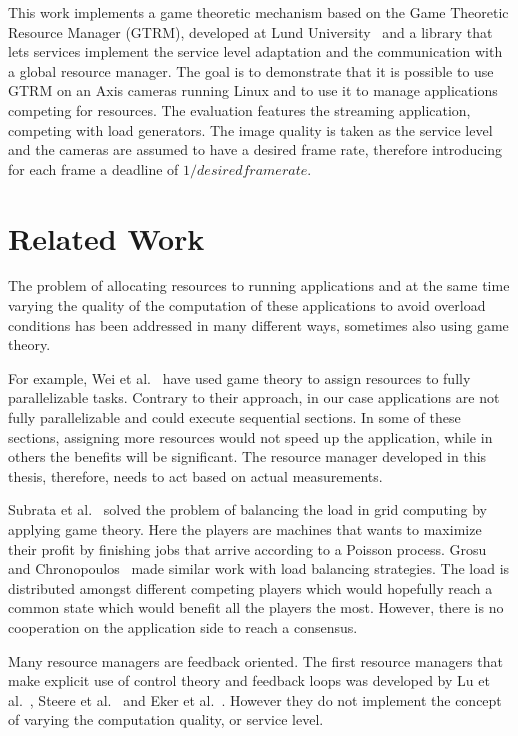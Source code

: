 \documentclass[nobiblatex]{LTHthesis}
\begin{document}
This work implements a game theoretic mechanism based on the Game Theoretic 
Resource Manager (GTRM), developed at Lund University~\cite{gtrm} and a
library that lets services implement the service level adaptation and the
communication with a global resource manager. The goal is to demonstrate
that it is possible to use GTRM on an Axis cameras running Linux and to use
it to manage applications competing for resources. The evaluation features
the streaming application, competing with load generators. The image quality
is taken as the service level and the cameras are assumed to have a desired
frame rate, therefore introducing for each frame a deadline of 
\(1/desired framerate\).

\section{Related Work}

The problem of allocating resources to running applications and at the same
time varying the quality of the computation of these applications to avoid
overload conditions has been addressed in many different ways, sometimes
also using game theory.  

For example, Wei et al.~\cite{Wei10} have used game theory to assign
resources to fully parallelizable tasks. Contrary to their approach, in our
case applications are not fully parallelizable and could execute sequential
sections. In some of these sections, assigning more resources would not
speed up the application, while in others the benefits will be significant.
The resource manager developed in this thesis, therefore, needs to act based
on actual measurements.

Subrata et al.~\cite{Sub08} solved the problem of balancing the load in grid 
computing by applying game theory. Here the players are machines that wants 
to maximize their profit by finishing jobs that arrive according to a 
Poisson process. Grosu and Chronopoulos~\cite{Gro05} made similar work with 
load balancing strategies. The load is distributed amongst different 
competing players which would hopefully reach a common state which would 
benefit all the players the most. However, there is no cooperation on the
application side to reach a consensus.

Many resource managers are feedback oriented. The first resource managers
that make explicit use of control theory and feedback loops was developed 
by Lu et al.~\cite{LuS99a}, Steere et al.~\cite{Ste99} and Eker et 
al.~\cite{Eke00}. However they do not implement the concept of varying the
computation quality, or service level.
\end{document}
